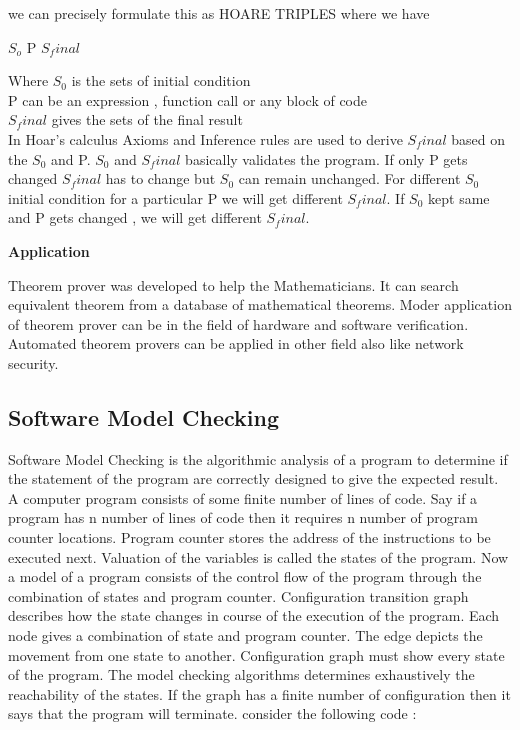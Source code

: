    we can precisely formulate this as HOARE TRIPLES where we have

 
         {$S_o$} P {$S_final$}
         
  Where $S_0$ is the sets of initial condition \\
        P can be an expression , function call or any block of code \\
        $S_final$ gives the sets of the final result \\
        
In Hoar's calculus Axioms and Inference rules are used to derive $S_final$ based
on the $S_0$ and P. $S_0$ and $S_final$ basically validates the program. If only P gets
changed $S_final$ has to change but $S_0$ can remain unchanged. For different $S_0$ 
initial condition for a particular P we will get different $S_final$. If $S_0$ kept
same and P gets changed , we will get different $S_final$.

\textbf{Application}

Theorem prover was developed to help the Mathematicians. It can search equivalent
theorem from a database of mathematical theorems. Moder application of theorem 
prover can be in the field of hardware and software verification. Automated theorem
provers can be applied in other field also like network security.
          
         

\subsection{Software Model Checking}

Software Model Checking is the algorithmic analysis of a program to determine
if the statement of the program are correctly designed to give the expected 
result. A computer program consists of some finite number of lines of code.
Say if a program has n number of lines of code then it requires n number of
program counter locations. Program counter stores the address of the instructions
to be executed next. Valuation of the variables is called the states of the program.
Now a model of a program  consists of the control flow of the program through the 
combination of states and program counter. 
Configuration transition graph describes how the state changes in course of the
execution of the program. Each node gives a combination of state and program 
counter. The edge depicts the movement from one state to another. Configuration
graph must show every state of the program. The model checking algorithms 
determines exhaustively the reachability of the states. If the graph has a finite
number of configuration then it says that the program will terminate. consider 
the following code :


